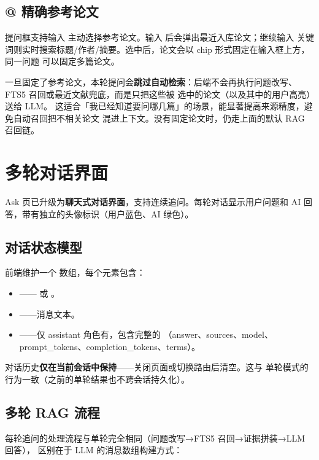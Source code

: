 \subsection{@ 精确参考论文}

提问框支持输入  主动选择参考论文。输入  后会弹出最近入库论文；继续输入
关键词则实时搜索标题/作者/摘要。选中后，论文会以 chip 形式固定在输入框上方，同一问题
可以固定多篇论文。

一旦固定了参考论文，本轮提问会\textbf{跳过自动检索}：后端不会再执行问题改写、FTS5
召回或最近文献兜底，而是只把这些被  选中的论文（以及其中的用户高亮）送给 LLM。
这适合「我已经知道要问哪几篇」的场景，能显著提高来源精度，避免自动召回把不相关论文
混进上下文。没有固定论文时，仍走上面的默认 RAG 召回链。

\section{多轮对话界面}

Ask 页已升级为\textbf{聊天式对话界面}，支持连续追问。每轮对话显示用户问题和
AI 回答，带有独立的头像标识（用户蓝色、AI 绿色）。


\subsection{对话状态模型}

前端维护一个  数组，每个元素包含：

\begin{itemize}
  \item {}—— 或 。
  \item {}——消息文本。
  \item {}——仅 assistant 角色有，包含完整的 
    （answer、sources、model、prompt\_tokens、completion\_tokens、terms）。
\end{itemize}

对话历史\textbf{仅在当前会话中保持}——关闭页面或切换路由后清空。这与
单轮模式的行为一致（之前的单轮结果也不跨会话持久化）。

\subsection{多轮 RAG 流程}

每轮追问的处理流程与单轮完全相同（问题改写→FTS5 召回→证据拼装→LLM 回答），
区别在于 LLM 的消息数组构建方式：

